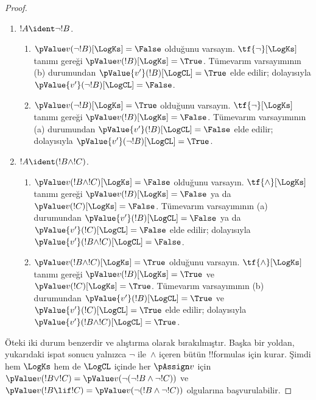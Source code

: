 \documentclass[../../../include/open-logic-section]{subfiles}
\begin{document}
\begin{proof}
\begin{enumerate}
    Tümevarım adımı için şu durumları ele alın:
    \item $!A \ident \lnot !B$. 
    \begin{enumerate}
      \item $\pValue v(\lnot!B)[\LogKs] = \False$ olduğunu varsayın.
      $\tf{\lnot}[\LogKs]$ tanımı gereği
      $\pValue v(!B)[\LogKs] = \True$. Tümevarım varsayımının (b) durumundan
      $\pValue {v'}(!B)[\LogCL] = \True$ elde edilir; dolayısıyla
      $\pValue {v'}(\lnot !B)[\LogCL] = \False$.
      \item $\pValue v(\lnot!B)[\LogKs] = \True$ olduğunu varsayın.
      $\tf{\lnot}[\LogKs]$ tanımı gereği
      $\pValue v(!B)[\LogKs] = \False$. Tümevarım varsayımının (a) durumundan
      $\pValue {v'}(!B)[\LogCL] = \False$ elde edilir; dolayısıyla
      $\pValue {v'}(\lnot !B)[\LogCL] = \True$.
    \end{enumerate}

    \item $!A \ident (!B \land !C)$.
    \begin{enumerate}
      \item $\pValue v(!B \land !C)[\LogKs] = \False$ olduğunu varsayın.
      $\tf{\land}[\LogKs]$ tanımı gereği
      $\pValue v(!B)[\LogKs] = \False$ ya da
      $\pValue v(!C)[\LogKs] = \False$. Tümevarım varsayımının (a)
      durumundan $\pValue {v'}(!B)[\LogCL] = \False$ ya da
      $\pValue {v'}(!C)[\LogCL] = \False$ elde edilir; dolayısıyla
      $\pValue {v'}(!B \land !C)[\LogCL] = \False$.
      \item $\pValue v(!B \land !C)[\LogKs] = \True$ olduğunu varsayın.
      $\tf{\land}[\LogKs]$ tanımı gereği
      $\pValue v(!B)[\LogKs] = \True$ ve
      $\pValue v(!C)[\LogKs] = \True$. Tümevarım varsayımının (b)
      durumundan $\pValue {v'}(!B)[\LogCL] = \True$ ve
      $\pValue {v'}(!C)[\LogCL] = \True$ elde edilir; dolayısıyla
      $\pValue {v'}(!B \land !C)[\LogCL] = \True$.
    \end{enumerate}
  \end{enumerate}

  Öteki iki durum benzerdir ve alıştırma olarak bırakılmıştır. Başka bir
  yoldan, yukarıdaki ispat sonucu yalnızca $\lnot$ ile~$\land$ içeren bütün
  !!{formula}s için kurar. Şimdi hem $\LogKs$ hem de $\LogCL$ içinde her
  $\pAssign v$ için $\pValue v(!B \lor !C) =
  \pValue v(\lnot(\lnot!B \land \lnot !C))$ ve
  $\pValue v(!B \lif !C) = \pValue v(\lnot(!B \land \lnot !C))$
  olgularına başvurulabilir.
\end{proof}
\end{document}
